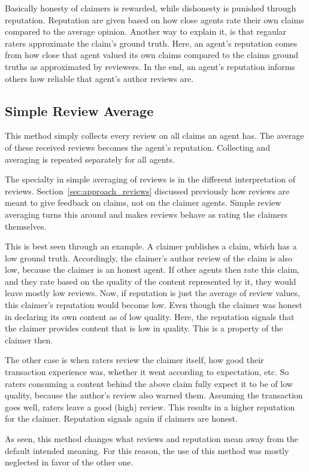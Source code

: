 \documentclass[%
    ]{\PathToTumTemplate/thesis/tum_thesis}
\begin{document}
Basically honesty of claimers is rewarded, while dishonesty is punished through reputation.
Reputation are given based on how close agents rate their own claims compared to the average opinion.
Another way to explain it, is that regaular raters approximate the claim's ground truth.
Here, an agent's reputation comes from how close that agent valued its own claims compared to the claims ground truths as approximated by reviewers.
In the end, an agent's reputation informs others how reliable that agent's author reviews are.


\subsection{Simple Review Average}
This method simply collects every review on all claims an agent has.
The average of these received reviews becomes the agent's reputation.
Collecting and averaging is repeated separately for all agents.

The specialty in simple averaging of reviews is in the different interpretation of reviews.
Section~\ref{sec:approach_reviews} discussed previously how reviews are meant to give feedback on claims, not on the claimer agents.
Simple review averaging turns this around and makes reviews behave as rating the claimers themselves.

This is best seen through an example.
A claimer publishes a claim, which has a low ground truth.
Accordingly, the claimer's author review of the claim is also low, because the claimer is an honest agent.
If other agents then rate this claim, and they rate based on the quality of the content represented by it, they would leave mostly low reviews.
Now, if reputation is just the average of review values, this claimer's reputation would become low.
Even though the claimer was honest in declaring its own content as of low quality.
Here, the reputation signals that the claimer provides content that is low in quality.
This is a property of the claimer then.

The other case is when raters review the claimer itself, how good their transaction experience was, whether it went according to expectation, etc.
So raters consuming a content behind the above claim fully expect it to be of low quality, because the author's review also warned them.
Assuming the transaction goes well, raters leave a good (high) review.
This results in a higher reputation for the claimer.
Reputation signals again if claimers are honest.

As seen, this method changes what reviews and reputation mean away from the default intended meaning.
For this reason, the use of this method was mostly neglected in favor of the other one.
\end{document}
